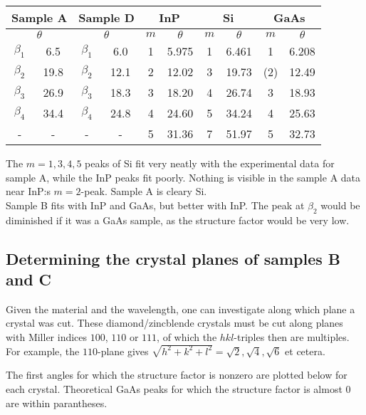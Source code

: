\documentclass[a4paper,twoside=false,abstract=false,numbers=noenddot,
titlepage=false,headings=small,parskip=half,version=last]{scrartcl}
\begin{document}
\begin{tabular}{ |c|c|c|c|c|c|c|c|c|c| }
    \hline
    \multicolumn{2}{|c|}{Sample A}
	& \multicolumn{2}{|c|}{Sample D}
	& \multicolumn{2}{|c|}{InP}
	& \multicolumn{2}{|c|}{Si}
	& \multicolumn{2}{|c|}{GaAs}\\
    \hline
	\multicolumn{2}{|c|}{$\theta$} & \multicolumn{2}{|c|}{$\theta$} & $m$ & $\theta$ & $m$ & $\theta$ & $m$ & $\theta$ \\
	\hline
    $\beta_1$	& 6.5\degree	& $\beta_1$	& 6.0\degree	& 1 & 5.975\degree & 1	& 6.461\degree &  1		& 6.208\degree	\\
    $\beta_2$	& 19.8\degree	& $\beta_2$	& 12.1\degree	& 2 & 12.02\degree & 3	& 19.73\degree & (2)	& 12.49\degree	\\
    $\beta_3$	& 26.9\degree	& $\beta_3$	& 18.3\degree	& 3 & 18.20\degree & 4	& 26.74\degree &  3		& 18.93\degree	\\
    $\beta_4$	& 34.4\degree	& $\beta_4$	& 24.8\degree	& 4 & 24.60\degree & 5	& 34.24\degree &  4		& 25.63\degree	\\
    -			& -				& -			& -				& 5 & 31.36\degree & 7	& 51.97\degree &  5		& 32.73\degree	\\
	\hline
\end{tabular}

The $m=1,3,4,5$ peaks of Si fit very neatly with the experimental data for sample A, while the InP peaks fit poorly.
Nothing is visible in the sample A data near InP:s $m=2$-peak.
Sample A is cleary Si.\\
Sample B fits with InP and GaAs, but better with InP. The peak at $\beta_2$ would be diminished if it was a GaAs sample, as the structure factor would be very low. 

\subsection{Determining the crystal planes of samples B and C}

Given the material and the wavelength, one can investigate along which plane a crystal was cut.
These diamond/zincblende crystals must be cut along planes with Miller indices $100$, $110$ or $111$, of which the $hkl$-triples then are multiples.
For example, the $110$-plane gives $\sqrt{h^2+k^2+l^2}=\sqrt{2},\sqrt{4},\sqrt{6}$ et cetera.

The first angles for which the structure factor is nonzero are plotted below for each crystal.
Theoretical GaAs peaks for which the structure factor is almost 0 are within parantheses.
\end{document}

